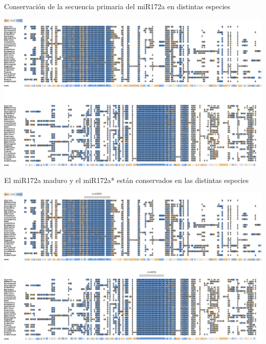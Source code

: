\documentclass{beamer}
\begin{document}
    


\begin{frame}{Conservación de la secuencia primaria del miR172a en distintas especies}
	\begin{center}
		\includegraphics[width=1\textwidth]{img/miR172a_tcoffee_01.png}
	\end{center}
\end{frame}

\begin{frame}{El miR172a maduro y el miR172a* están conservados en las distintas especies}
	\begin{center}
		\includegraphics[width=1\textwidth]{img/miR172a_tcoffee_02.png}
	\end{center}
\end{frame}
\end{document}
